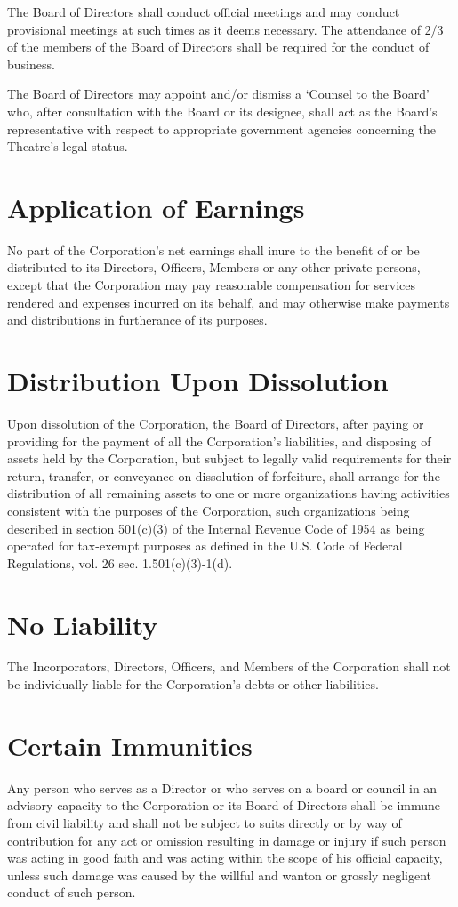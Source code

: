\documentclass{wst}
\begin{document}
\begin{outline}[enumerate]
\1 The Board of Directors shall conduct official meetings and may conduct
provisional meetings at such times as it deems necessary.  The attendance of
2/3 of the members of the Board of Directors shall be required for the conduct
of business.

\1 The Board of Directors may appoint and/or dismiss a ‘Counsel to the Board’
who, after consultation with the Board or its designee, shall act as the
Board’s representative with respect to appropriate government agencies
concerning the Theatre’s legal status.

\end{outline}

\section{Application of Earnings}
No part of the Corporation’s net earnings shall inure to the benefit of or be
distributed to its Directors, Officers, Members or any other private persons,
except that the Corporation may pay reasonable compensation for services
rendered and expenses incurred on its behalf, and may otherwise make payments
and distributions in furtherance of its purposes.

\section{Distribution Upon Dissolution}
Upon dissolution of the Corporation, the Board of Directors, after paying or
providing for the payment of all the Corporation’s liabilities, and disposing
of assets held by the Corporation, but subject to legally valid requirements
for their return, transfer, or conveyance on dissolution of forfeiture, shall
arrange for the distribution of all remaining assets to one or more
organizations having activities consistent with the purposes of the
Corporation, such organizations being described in section  501(c)(3) of the
Internal Revenue Code of 1954 as being operated for tax-exempt purposes as
defined in the U.S. Code of Federal Regulations, vol. 26 sec. 1.501(c)(3)-1(d).

\section{No Liability}
The Incorporators, Directors, Officers, and Members of the Corporation shall
not be individually liable for the Corporation’s debts or other liabilities.

\section{Certain Immunities}
Any person who serves as a Director or who serves on a board or council in an
advisory capacity to the Corporation or its Board of Directors shall be immune
from civil liability and shall not be subject to suits directly or by way of
contribution for any act or omission resulting in damage or injury if such
person was acting in good faith and was acting within the scope of his official
capacity, unless such damage was caused by the willful and wanton or grossly
negligent conduct of such person.
\end{document}
